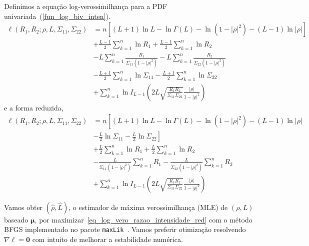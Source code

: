 Definimos a equação log-verossimilhança para a PDF univariada~(\ref{fun_log_biv_inten}).
\begin{equation}\nonumber
\begin{split} 
  \ell(R_1, R_2;\rho, L, \Sigma_{11}, \Sigma_{22})&=n\left[(L+1)\ln L - \ln\Gamma(L)- \ln(1-|\rho|^2)-(L-1)\ln|\rho|\right] \\
                        &+\frac{L-1}{2}\sum_{k=1}^{n} \ln R_1 +\frac{L-1}{2} \sum_{k=1}^{n}\ln R_2\\
                        &-L\sum_{k=1}^{n}\frac{R_1}{\Sigma_{11}(1-|\rho|^2)}-L\sum_{k=1}^{n}\frac{R_2}{\Sigma_{22}(1-|\rho|^2)}\\
	&-\frac{L+1}{2}\sum_{k=1}^{n}\ln\Sigma_{11}-\frac{L+1}{2}\sum_{k=1}^{n}\ln\Sigma_{22} \\
	&+\sum_{k=1}^{n}\ln I_{L-1}\left(2L\sqrt{\frac{R_1R_2}{\Sigma_{11}\Sigma_{22}}}\frac{|\rho|}{1-|\rho|^2}\right)
\end{split}
\end{equation} 
e a forma reduzida,
\begin{equation}\label{eq_log_vero_biv_prod_red}
\begin{split}
\ell(R_1, R_2;\rho, L, \Sigma_{11}, \Sigma_{22})&=n\left[(L+1)\ln L - \ln\Gamma(L)- \ln(1-|\rho|^2)-(L-1)\ln|\rho|\right. \\
	                    &-\left.\frac{L}{2}\ln\Sigma_{11}-\frac{L}{2}\ln\Sigma_{22}\right] \\
                        &+\frac{L}{2}\sum_{k=1}^{n} \ln R_1 +\frac{L}{2} \sum_{k=1}^{n}\ln R_2\\
                        &-\frac{L}{\Sigma_{11}(1-|\rho|^2)}\sum_{k=1}^{n}R_1-\frac{L}{\Sigma_{22}(1-|\rho|^2)}\sum_{k=1}^{n}R_2\\
	&+\sum_{k=1}^{n}\ln I_{L-1}\left(2L\sqrt{\frac{R_1R_2}{\Sigma_{11}\Sigma_{22}}}\frac{|\rho|}{1-|\rho|^2}\right)
\end{split}
 \end{equation} 

Vamos obter $(\widehat \rho, \widehat L)$, o estimador de máxima verossimilhança (MLE) de $(\rho, L)$ baseado $\bm \mu$, por maximizar~\eqref{eq_log_vero_razao_intensidade_red} com o método BFGS implementado no pacote \texttt{maxLik}~\citep{ht}. Vamos preferir otimização resolvendo $\nabla\ell=\bm 0$ com intuito de melhorar a estabilidade numérica.

